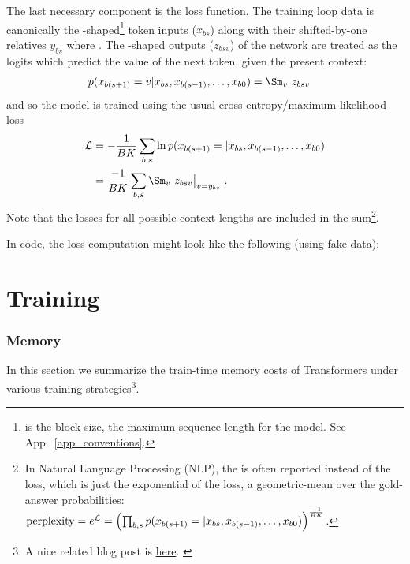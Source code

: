 \documentclass[11pt]{article}
\begin{document}
The last necessary component is the loss function. The training loop data is canonically the
-shaped\footnote{ is the block size, the maximum sequence-length for
the model. See App.~\ref{app_conventions}.}  token inputs ($ x _{ bs } $) along with their shifted-by-one relatives $ y
_{ bs }$ where .  The -shaped
outputs ($ z _{ bsv } $)  of the  network are treated as the logits which
predict the value of the next token, given the present context:
\begin{align}
    p(x _{ b (s+1) }=v| x _{ b s }, x _{ b (s-1) }, \ldots, x _{ b 0 }) &= \Sm _{ v }\ z _{ bsv
    }\label{eq_transformer_conditional_prob}
\end{align}
and so the model is trained using the usual cross-entropy/maximum-likelihood loss
\begin{align}
  \Lcal &= -\frac{ 1 }{ BK }\sum _{ b,s }\ln p(x _{ b (s+1) }=| x _{ b s }, x _{ b (s-1) },
  \ldots, x _{ b 0 })\nn
  &= \frac{- 1 }{ BK }\sum _{ b,s }\Sm _{ v }\ z _{ bsv}\big| _{ v=y _{ bs } } \ .
\end{align}
Note that the losses for all possible context lengths are included in the sum\footnote{In Natural Language Processing (NLP),
the  is often reported instead of the loss, which is just the exponential of the loss, a geometric-mean over the
gold-answer probabilities: $ {\rm perplexity} = e^{ \mathcal{L} } =\left (\prod _{ b, s }p(x _{ b (s+1) }=| x _{ b s }, x _{ b (s-1) },
  \ldots, x _{ b 0 })\right ) ^{ \frac{ -1 }{ BK } }$.}.

In 
code, the loss computation might look like the following (using fake data):

\part{Training}

\section{Memory \label{sec_memory_training}}

In this section we summarize the train-time memory costs of Transformers under various training
strategies\footnote{A nice related blog post is \href{https://blog.eleuther.ai/transformer-math/}{here}. \label{foot_eleuther_math_101} }.
\end{document}
